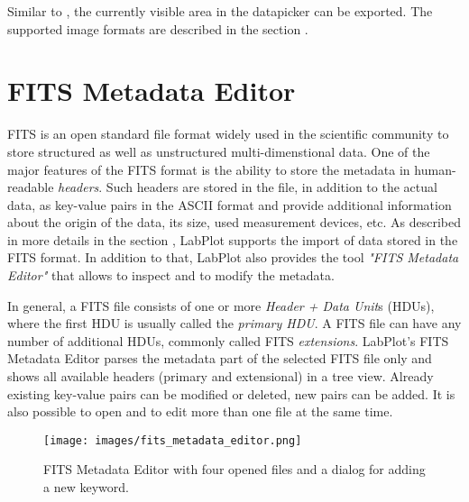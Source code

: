 Similar to , the currently visible area in the datapicker can be exported. The supported image formats are described in the section .


\section{FITS Metadata Editor}
FITS is an open standard file format widely used in the scientific community to store structured as well as unstructured multi-dimenstional data. One of the major features of the FITS format is the ability to store the metadata in human-readable \textit{headers}. Such headers are stored in the file, in addition to the actual data, as key-value pairs in the ASCII format and provide additional information about the origin of the data, its size, used measurement devices, etc. As described in more details in the section , LabPlot supports the import of data stored in the FITS format. In addition to that, LabPlot also provides the tool \textit{"FITS Metadata Editor"} that allows to inspect and to modify the metadata.

In general, a FITS file consists of one or more \textit{Header + Data Unit}s (HDUs), where the first HDU is usually called the \textit{primary HDU}. A FITS file can have any number of additional HDUs, commonly called FITS \textit{extensions}. LabPlot's FITS Metadata Editor parses the metadata part of the selected FITS file only and shows all available headers (primary and extensional) in a tree view. Already existing key-value pairs can be modified or deleted, new pairs can be added. It is also possible to open and to edit more than one file at the same time.

\begin{figure}
\texttt{[image: images/fits\_metadata\_editor.png]}
\caption{FITS Metadata Editor with four opened files and a dialog for adding a new keyword.}
\end{figure}
